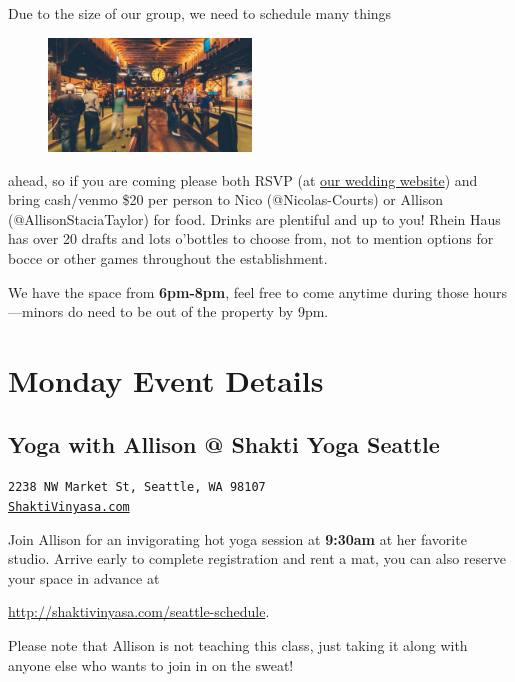 \documentclass[10pt]{article}
\begin{document}
Due to the size 
of our group, we need to schedule many things 
\begin{figure}
    \begin{center}
        \includegraphics[width=0.48\textwidth]{rheinhaus}
    \end{center}
\end{figure}
ahead, so if you are coming please both RSVP (at \href{https://courtay.info}{our wedding website}) and bring cash/venmo 
\$20 per person to Nico (@Nicolas-Courts) or Allison (@AllisonStaciaTaylor) for food. Drinks are plentiful and up 
to you! Rhein Haus has over 20 drafts and lots o'bottles to choose from, not to mention options for bocce or other 
games throughout the establishment. 

We have the space from \textbf{6pm-8pm}, feel free to come 
anytime during those hours---minors do need to be out of the property by 9pm.

\newpage
\section{Monday Event Details}
\subsection{Yoga with Allison @ Shakti Yoga Seattle}
\label{subsec-yoga}
\begin{center}
    \texttt{2238 NW Market St, Seattle, WA 98107\\\href{http://shaktivinyasa.com/}{ShaktiVinyasa.com}}
\end{center}

Join Allison for an invigorating hot yoga session at \textbf{9:30am} at her favorite studio. Arrive early to complete 
registration and rent a mat, you can also reserve your space in advance at 
\begin{center}
    \href{http://shaktivinyasa.com/seattle-schedule}{http://shaktivinyasa.com/seattle-schedule}.
\end{center}

Please note that Allison is not teaching this class, just taking it along with anyone else who wants to 
join in on the sweat!
\end{document}
